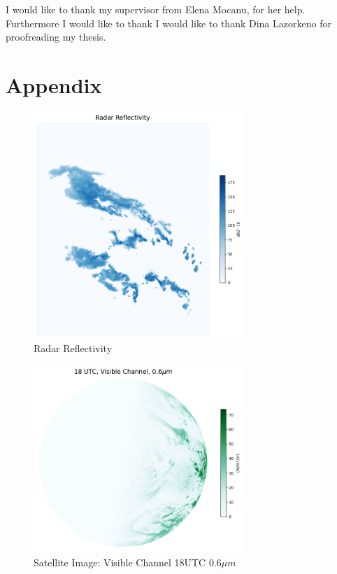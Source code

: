 \documentclass[acmtog, authorversion]{acmart}
\begin{document}
\begin{acks}
I would like to thank my supervisor from Elena Mocanu, for her help. Furthermore I would like to thank I would like to thank Dina Lazorkeno for proofreading my thesis.
\end{acks}




\newpage
\appendix
\section{Appendix}

\begin{figure}
    \centering
    \includegraphics[width=225pt]{./images/radar_reflectivity.png}
    \caption{Radar Reflectivity}
    \Description{}
    \label{fig:reflect}
\end{figure}

\begin{figure}
    \centering
    \includegraphics[width=225pt]{./images/vis_006.png}
    \caption{Satellite Image: Visible Channel 18UTC $0.6\mu m$}
    \Description{}
    \label{fig:vis}
\end{figure}
\end{document}
